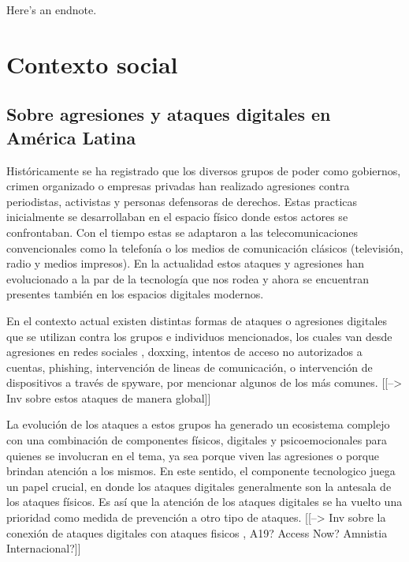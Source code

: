 \documentclass[12pt]{caltech_thesis}
\begin{document}
Here's an endnote.


\chapter{Contexto social}

\section{Sobre agresiones y ataques digitales en América Latina}

Históricamente se ha registrado que los diversos grupos de poder como gobiernos, crimen organizado o empresas privadas han realizado agresiones contra periodistas, activistas y personas defensoras de derechos. Estas practicas inicialmente se desarrollaban en el espacio físico donde estos actores se confrontaban. Con el tiempo estas se adaptaron a las telecomunicaciones convencionales como la telefonía o los medios de comunicación clásicos (televisión, radio y medios impresos). En la actualidad estos ataques y agresiones han evolucionado a la par de la tecnología que nos rodea y ahora se encuentran presentes también en los espacios digitales modernos.

En el contexto actual existen distintas formas de ataques o agresiones digitales que se utilizan contra los grupos e individuos mencionados, los cuales van desde agresiones en redes sociales , doxxing, intentos de acceso no autorizados a cuentas, phishing, intervención de lineas de comunicación, o intervención de dispositivos a través de spyware, por mencionar algunos de los más comunes. [[--> Inv sobre estos ataques de manera global]]

La evolución de los ataques a estos grupos ha generado un ecosistema complejo con una combinación de componentes físicos, digitales y psicoemocionales para quienes se involucran en el tema, ya sea porque viven las agresiones o porque brindan atención a los mismos. En este sentido, el componente tecnologico juega un papel crucial, en donde los ataques digitales generalmente son la antesala de los ataques físicos. Es así que la atención de los ataques digitales se ha vuelto una prioridad como medida de prevención a otro tipo de ataques. [[--> Inv sobre la conexión de ataques digitales con ataques fisicos , A19? Access Now? Amnistia Internacional?]]
\end{document}
